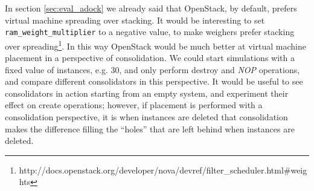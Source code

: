 In section \ref{sec:eval_adock} we already said that OpenStack, by default, prefers virtual machine spreading over stacking. It would be interesting to set \texttt{ram\_weight\_multiplier} to a negative value, to make weighers prefer stacking over spreading\footnote{http://docs.openstack.org/developer/nova/devref/filter\_scheduler.html\#weights}. In this way OpenStack would be much better at virtual machine placement in a perspective of consolidation. We could start simulations with a fixed value of instances, e.g. $30$, and only perform destroy and \textit{NOP} operations, and compare different consolidators in this perspective. It would be useful to see consolidators in action starting from an empty system, and experiment their effect on create operations; however, if placement is performed with a consolidation perspective, it is when instances are deleted that consolidation makes the difference filling the ``holes'' that are left behind when instances are deleted.
